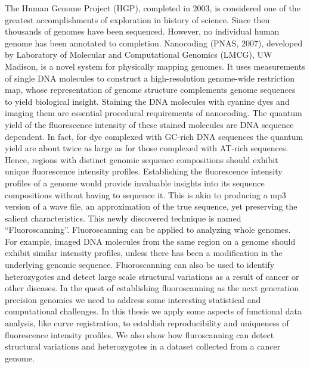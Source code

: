 %
%
%

\noindent       %
The Human Genome Project (HGP), completed in 2003, is considered one of the greatest accomplishments of exploration in history of science. Since then thousands of genomes have been sequenced. However, no individual human genome has been annotated to completion. Nanocoding \cite{Jo_etal_2007_PNAS} (PNAS, 2007), developed by Laboratory of Molecular and Computational Genomics (LMCG), UW Madison, is a novel system for physically mapping genomes. It uses measurements of single DNA molecules to construct a high-resolution genome-wide restriction map, whose representation of genome structure complements genome sequences to yield biological insight. Staining the DNA molecules with cyanine dyes and imaging them are essential procedural requirements of nanocoding. The quantum yield of the fluorescence intensity of these stained molecules are DNA sequence dependent. In fact, for dye complexed with GC-rich DNA sequences the quantum yield are about twice as large as for those complexed with AT-rich sequences. Hence, regions with distinct genomic sequence compositions should exhibit unique fluorescence intensity profiles. Establishing the fluorescence intensity profiles of a genome would provide invaluable insights into its sequence compositions without having to sequence it. This is akin to producing a mp3 version of a wave file, an approximation of the true sequence, yet preserving the salient characteristics. This newly discovered technique is named ``Fluoroscanning''. Fluoroscanning can be applied to analyzing whole genomes. For example, imaged DNA molecules from the same region on a genome should exhibit similar intensity profiles, unless there has been a modification in the underlying genomic sequence. Fluoroscanning can also be used to identify heterozygotes and detect large scale structural variations as a result of cancer or other diseases. In the quest of establishing fluoroscanning as the next generation precision genomics we need to address some interesting statistical and computational challenges. In this thesis we apply some aspects of functional data analysis, like curve registration, to establish reproducibility and uniqueness of fluorescence intensity profiles. We also show how fluroscanning can detect structural variations and heterozygotes in a dataset collected from a cancer genome.


